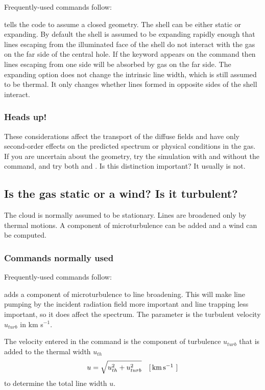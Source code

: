 \documentclass[12pt,twoside]{article}
\begin{document}
{Frequently-used commands follow:

\label{command:sphere}
tells the code to assume a closed geometry.
The shell can be either static or expanding.  By default the shell is assumed
to be expanding rapidly enough that lines escaping from the illuminated
face of the shell do not interact with the gas on the far side of the central
hole.  If the  keyword appears
on the  command then lines
escaping from one side will be absorbed by gas on the far side.  The
expanding option does not change the intrinsic line width, which is still
assumed to be thermal.  It only changes whether lines formed in opposite
sides of the shell interact.

\subsubsection{Heads up!}

These considerations affect the transport of the diffuse fields and have
only second-order effects on the predicted spectrum or physical conditions
in the gas.  If you are uncertain about the geometry, try the simulation
with and without the  command,
and try both  and .  Is this distinction important?  It usually is not.

\subsection{Is the gas static or a wind?  Is it turbulent?}

The cloud is normally assumed to be stationary.  Lines are broadened
only by thermal motions.  A component of microturbulence can be added and
a wind can be computed.

\subsubsection{Commands normally used}

Frequently-used commands follow:

 adds a component of
microturbulence to line broadening.  This
will make line pumping by the incident radiation field more important and line
trapping less important, so it does affect the spectrum.  The parameter
is the turbulent velocity $u_\mathit{turb}$ in km s$^{-1}$.
\label{sec:TurbulenceWind}

The velocity entered in the 
command is the component of
turbulence $u_\mathit{turb}$ that is added to the thermal width $u_\mathit{th}$
\begin{equation}
u = \sqrt {u_{th}^2  + u_{turb}^2 }\quad \rm{[\mbox{${\rm\thinspace km}\mbox{${\rm\thinspace s}^{-1}\,$}\,$}]}
\end{equation}
to determine the total line width $u$.

}
\end{document}
